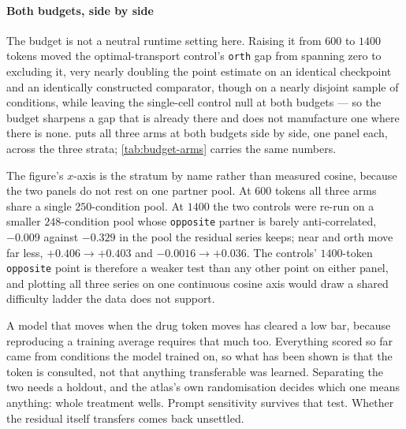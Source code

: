 \paragraph{Both budgets, side by side} The budget is not a neutral runtime
setting here. Raising it from $600$ to $1400$ tokens moved the
optimal-transport control's \texttt{orth} gap from spanning zero to excluding
it, very nearly doubling the point estimate on an identical checkpoint and an
identically constructed comparator, though on a nearly disjoint sample of
conditions, while leaving the single-cell control null at both budgets --- so
the budget sharpens a gap that is already there and does not manufacture one
where there is none.  puts all three arms at both budgets side
by side, one panel each, across the three strata;
\cref{tab:budget-arms} carries the same numbers.

The figure's $x$-axis is the stratum by name rather than measured cosine,
because the two panels do not rest on one partner pool. At $600$ tokens all
three arms share a single $\num{250}$-condition pool. At $1400$ the two controls
were re-run on a smaller $\num{248}$-condition pool whose \texttt{opposite}
partner is barely anti-correlated, $-0.009$ against $-0.329$ in the pool the
residual series keeps; near and orth move far less, $+0.406\rightarrow+0.403$
and $-0.0016\rightarrow+0.036$. The controls' $1400$-token \texttt{opposite}
point is therefore a weaker test than any other point on either panel, and
plotting all three series on one continuous cosine axis would draw a shared
difficulty ladder the data does not support.


\label{sec:methods-holdout}

\begin{question}[6]
A model that moves when the drug token moves has cleared a low bar, because
reproducing a training average requires that much too. Everything scored so far
came from conditions the model trained on, so what has been shown is that the
token is consulted, not that anything transferable was learned. Separating the
two needs a holdout, and the
atlas's own randomisation decides which one means anything: whole treatment
wells. Prompt sensitivity survives that test. Whether the residual itself
transfers comes back unsettled.
\end{question}

\noindent

